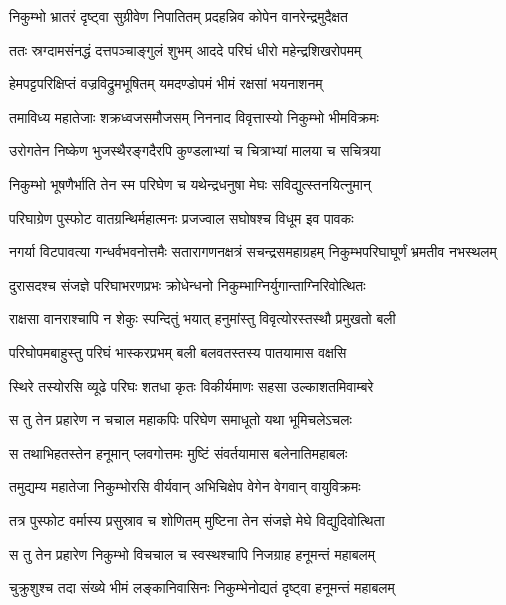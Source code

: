 
\twolineshloka
{निकुम्भो भ्रातरं दृष्ट्वा सुग्रीवेण निपातितम्}
{प्रदहन्निव कोपेन वानरेन्द्रमुदैक्षत} %

\twolineshloka
{ततः स्रग्दामसंनद्धं दत्तपञ्चाङ्गुलं शुभम्}
{आददे परिघं धीरो महेन्द्रशिखरोपमम्} %

\twolineshloka
{हेमपट्टपरिक्षिप्तं वज्रविद्रुमभूषितम्}
{यमदण्डोपमं भीमं रक्षसां भयनाशनम्} %

\twolineshloka
{तमाविध्य महातेजाः शक्रध्वजसमौजसम्}
{निननाद विवृत्तास्यो निकुम्भो भीमविक्रमः} %

\twolineshloka
{उरोगतेन निष्केण भुजस्थैरङ्गदैरपि}
{कुण्डलाभ्यां च चित्राभ्यां मालया च सचित्रया} %

\twolineshloka
{निकुम्भो भूषणैर्भाति तेन स्म परिघेण च}
{यथेन्द्रधनुषा मेघः सविद्युत्स्तनयित्नुमान्} %

\twolineshloka
{परिघाग्रेण पुस्फोट वातग्रन्थिर्महात्मनः}
{प्रजज्वाल सघोषश्च विधूम इव पावकः} %

\threelineshloka
{नगर्या विटपावत्या गन्धर्वभवनोत्तमैः}
{सतारागणनक्षत्रं सचन्द्रसमहाग्रहम्}
{निकुम्भपरिघाघूर्णं भ्रमतीव नभस्थलम्} %

\twolineshloka
{दुरासदश्च संजज्ञे परिघाभरणप्रभः}
{क्रोधेन्धनो निकुम्भाग्निर्युगान्ताग्निरिवोत्थितः} %

\twolineshloka
{राक्षसा वानराश्चापि न शेकुः स्पन्दितुं भयात्}
{हनुमांस्तु विवृत्योरस्तस्थौ प्रमुखतो बली} %

\twolineshloka
{परिघोपमबाहुस्तु परिघं भास्करप्रभम्}
{बली बलवतस्तस्य पातयामास वक्षसि} %

\twolineshloka
{स्थिरे तस्योरसि व्यूढे परिघः शतधा कृतः}
{विकीर्यमाणः सहसा उल्काशतमिवाम्बरे} %

\twolineshloka
{स तु तेन प्रहारेण न चचाल महाकपिः}
{परिघेण समाधूतो यथा भूमिचलेऽचलः} %

\twolineshloka
{स तथाभिहतस्तेन हनूमान् प्लवगोत्तमः}
{मुष्टिं संवर्तयामास बलेनातिमहाबलः} %

\twolineshloka
{तमुद्यम्य महातेजा निकुम्भोरसि वीर्यवान्}
{अभिचिक्षेप वेगेन वेगवान् वायुविक्रमः} %

\twolineshloka
{तत्र पुस्फोट वर्मास्य प्रसुस्राव च शोणितम्}
{मुष्टिना तेन संजज्ञे मेघे विद्युदिवोत्थिता} %

\twolineshloka
{स तु तेन प्रहारेण निकुम्भो विचचाल च}
{स्वस्थश्चापि निजग्राह हनूमन्तं महाबलम्} %

\twolineshloka
{चुक्रुशुश्च तदा संख्ये भीमं लङ्कानिवासिनः}
{निकुम्भेनोद्यतं दृष्ट्वा हनूमन्तं महाबलम्} %

